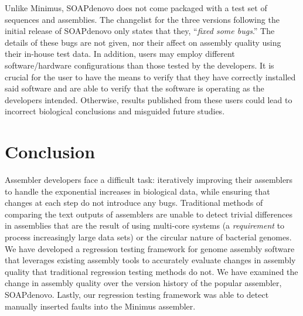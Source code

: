 Unlike Minimus, SOAPdenovo does not come packaged with a test set of sequences and assemblies.
The changelist for the three versions following the initial release of SOAPdenovo only states that they, ``\emph{fixed some bugs}.''
The details of these bugs are not given, nor their affect on assembly quality using their in-house test data.
In addition, users may employ different software/hardware configurations than those tested by the developers.
It is crucial for the user to have the means to verify that they have correctly installed said software and are able to verify that the software is operating as the developers intended.
Otherwise, results published from these users could lead to incorrect biological conclusions and misguided future studies.







\section{Conclusion}
\label{conclusion}
Assembler developers face a difficult task: iteratively improving their assemblers to handle the exponential increases in biological data, while ensuring that changes at each step do not introduce any bugs.
Traditional methods of comparing the text outputs of assemblers are unable to detect trivial differences in assemblies that are the result of using multi-core systems (a \emph{requirement} to process increasingly large data sets) or the circular nature of bacterial genomes.
We have developed a regression testing framework for genome assembly software that leverages existing assembly tools to accurately evaluate changes in assembly quality that traditional regression testing methods do not.
We have examined the change in assembly quality over the version history of the popular assembler, SOAPdenovo.
Lastly, our regression testing framework was able to detect manually inserted faults into the Minimus assembler.

